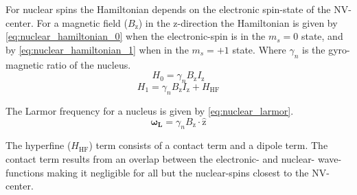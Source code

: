 For nuclear spins the Hamiltonian depends on the electronic spin-state of the NV-center.
For a magnetic field ($B_\mathrm{z}$) in the z-direction the Hamiltonian is given by \cref{eq:nuclear_hamiltonian_0} when the electronic-spin is in the $m_s = 0$ state, and by \cref{eq:nuclear_hamiltonian_1} when in the $m_s = +1$ state\citep{Taminiau2014Universal}. Where $\gamma_n$ is the gyro-magnetic ratio of the nucleus.
 \begin{equation}
 \label{eq:nuclear_hamiltonian_0}
H_0= \gamma_{n} B_\mathrm{z} I_\mathrm{z}
\end{equation}
\begin{equation}
 \label{eq:nuclear_hamiltonian_1}
    H_1 = \gamma_{n} B_\mathrm{z} I_\mathrm{z} +H_{\mathrm{HF}}
\end{equation}

The Larmor frequency for a nucleus is given by  \cref{eq:nuclear_larmor}.
\begin{equation}
\label{eq:nuclear_larmor}
\bm{\omega_L} = \gamma_{n}B_\mathrm{z} \cdot\bm{\hat{\mathrm{z}}}
\end{equation}

The hyperfine ($H_{\mathrm{HF}}$) term consists of a contact term and a dipole term.
The contact term results from an overlap between the electronic- and nuclear- wave-functions making it negligible for all but the nuclear-spins closest to the NV-center.

